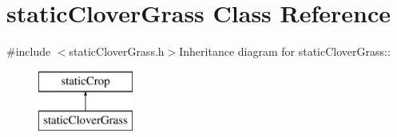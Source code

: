 \hypertarget{classstatic_clover_grass}{
\section{staticCloverGrass Class Reference}
\label{classstatic_clover_grass}
}


{\ttfamily \#include $<$staticCloverGrass.h$>$}Inheritance diagram for staticCloverGrass::\begin{figure}[H]
\begin{center}
\leavevmode
\includegraphics[height=2cm]{classstatic_clover_grass}
\end{center}
\end{figure}
